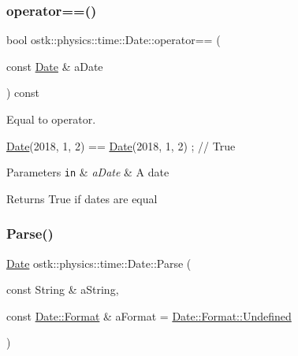 \subsubsection{\texorpdfstring{operator==()}{operator==()}}
{\footnotesize\ttfamily bool ostk\+::physics\+::time\+::\+Date\+::operator== (\begin{DoxyParamCaption}\item[{const \hyperlink{classostk_1_1physics_1_1time_1_1_date}{Date} \&}]{a\+Date }\end{DoxyParamCaption}) const}



Equal to operator. 


\begin{DoxyCode}
\hyperlink{classostk_1_1physics_1_1time_1_1_date_a3ff43a5f7a8ce8350e894b51befeb50d}{Date}(2018, 1, 2) == \hyperlink{classostk_1_1physics_1_1time_1_1_date_a3ff43a5f7a8ce8350e894b51befeb50d}{Date}(2018, 1, 2) ; \textcolor{comment}{// True}
\end{DoxyCode}



\begin{DoxyParams}[1]{Parameters}
\mbox{\tt in}  & {\em a\+Date} & A date \\
\hline
\end{DoxyParams}
\begin{DoxyReturn}{Returns}
True if dates are equal 
\end{DoxyReturn}
\mbox{\label{classostk_1_1physics_1_1time_1_1_date_a385deed9349a7b4fc20f5502c4919600}} 
\subsubsection{\texorpdfstring{Parse()}{Parse()}}
{\footnotesize\ttfamily \hyperlink{classostk_1_1physics_1_1time_1_1_date}{Date} ostk\+::physics\+::time\+::\+Date\+::\+Parse (\begin{DoxyParamCaption}\item[{const String \&}]{a\+String,  }\item[{const \hyperlink{classostk_1_1physics_1_1time_1_1_date_a77a2e52ee3bcfd7c93139d2fe2c9a141}{Date\+::\+Format} \&}]{a\+Format = {\ttfamily \hyperlink{classostk_1_1physics_1_1time_1_1_date_a77a2e52ee3bcfd7c93139d2fe2c9a141aec0fc0100c4fc1ce4eea230c3dc10360}{Date\+::\+Format\+::\+Undefined}} }\end{DoxyParamCaption})\hspace{0.3cm}{\ttfamily [static]}}



